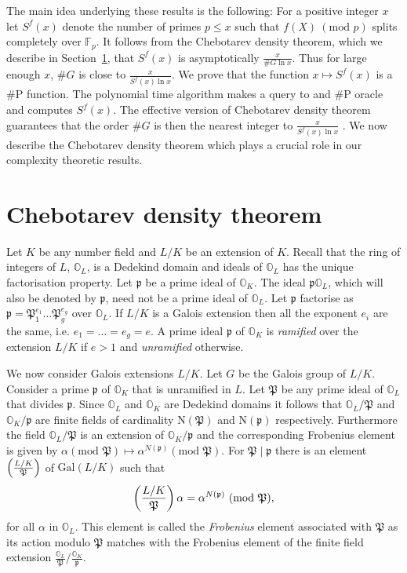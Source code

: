 \documentclass[11pt]{madras}%
\theoremstyle{remark}
\newcommand{\Norm}[1]{{\ensuremath{\mathrm{N}\left(#1\right)}}}
\newcommand{\Gal}[1]{{\ensuremath{\mathrm{Gal}\left(#1\right)}}}
\newcommand{\Ideal}[1]{{\ensuremath{\mathfrak{#1}}}}
\newcommand{\Frob}[2]{\ensuremath{\left(#1 \over #2\right)}}
\newcommand{\Int}[1][]{{\ensuremath{\mathbb{O}_{#1}}}}
\begin{document}
The main idea underlying these results is the following: For a
positive integer $x$ let $S^f(x)$ denote the number of primes $p \leq
x$ such that $f(X)\ (\textrm{mod } p)$ splits completely over
$\mathbb{F}_p$.  It follows from the Chebotarev density theorem, which
we describe in Section~\ref{sect-chebotarev-density}, that $S^f(x)$ is
asymptotically $\frac{x}{\# G\ln{x}}$. Thus for large enough $x$,
$\#G$ is close to $\frac{x}{S^f(x) \ln{x}}$. We prove that the
function $x \mapsto S^f(x)$ is a $\# \mathrm{P}$ function.  The
polynomial time algorithm makes a query to and $\# \mathrm{P}$ oracle
and computes $S^f(x)$. The effective version of Chebotarev density
theorem guarantees that the order $\# G$ is then the nearest integer
to $\frac{x}{S^f(x) \ln{x}}$ .  We now describe the Chebotarev density
theorem which plays a crucial role in our complexity theoretic
results.


\section{Chebotarev density theorem}\label{sect-chebotarev-density}


Let $K$ be any number field and $L/K$ be an extension of $K$. Recall
that the ring of integers of $L$, $\Int[L]$, is a Dedekind domain and
ideals of $\Int[L]$ has the unique factorisation property.  Let
$\Ideal{p}$ be a prime ideal of $\Int[K]$. The ideal $\Ideal{p}
\Int[L]$, which will also be denoted by $\Ideal{p}$, need not be a
prime ideal of $\Int[L]$. Let $\Ideal{p}$ factorise as $\Ideal{p} =
\Ideal{P}_1^{e_1} \ldots \Ideal{P}_g^{e_g}$ over $\Int[L]$.  If $L/K$
is a Galois extension then all the exponent $e_i$ are the same, i.e.
$e_1 = \ldots = e_g = e$. A prime ideal $\Ideal{p}$ of $\Int[K]$ is
\emph{ramified} over the extension $L/K$ if $e>1$
and \emph{unramified} otherwise.

We now consider Galois extensions $L/K$. Let $G$ be the Galois group
of $L/K$. Consider a prime $\Ideal{p}$ of $\Int[K]$ that is unramified
in $L$. Let $\Ideal{P}$ be any prime ideal of $\Int[L]$ that divides
$\Ideal{p}$. Since $\Int[L]$ and $\Int[K]$ are Dedekind domains it
follows that $\Int[L]/\Ideal{P}$ and $\Int[K]/\Ideal{p}$ are finite
fields of cardinality $\Norm{\Ideal{P}}$ and $\Norm{\Ideal{p}}$
respectively. Furthermore the field $\Int[L]/\Ideal{P}$ is an
extension of $\Int[K]/\Ideal{p}$ and the corresponding Frobenius
element is given by $\alpha (\textrm{mod } \Ideal{P}) \mapsto
\alpha^{N(\Ideal{p})} (\textrm{mod } \Ideal{P})$.  For $\Ideal{P} \mid
\Ideal{p}$ there is an element $\Frob{L/K}{\Ideal{P}}$ of $\Gal{L/K}$
such that
\[
\Frob{L/K}{\Ideal{P}} \alpha = \alpha^{N(\Ideal{p})}\ (\textrm{mod }
\Ideal{P}),
\]
for all $\alpha$ in $\Int[L]$. This element is called the
\emph{Frobenius} element associated with $\Ideal{P}$
as its action modulo $\Ideal{P}$ matches with the Frobenius element of
the finite field extension
$\frac{\Int[L]}{\Ideal{P}}/\frac{\Int[K]}{\Ideal{p}}$.
\end{document}
